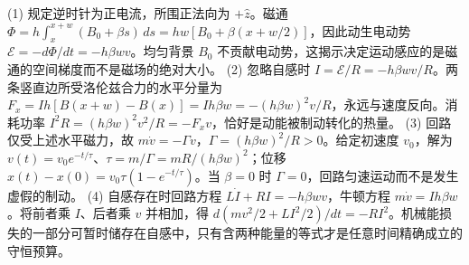 (1) 规定逆时针为正电流，所围正法向为 \(+\hat z\)。磁通 \(\Phi=h\int_x^{x+w}(B_0+\beta s)\,ds=hw[B_0+\beta(x+w/2)]\)，因此动生电动势 \(\mathcal E=-d\Phi/dt=-h\beta wv\)。均匀背景 \(B_0\) 不贡献电动势，这揭示决定运动感应的是磁通的空间梯度而不是磁场的绝对大小。
(2) 忽略自感时 \(I=\mathcal E/R=-h\beta wv/R\)。两条竖直边所受洛伦兹合力的水平分量为 \(F_x=Ih[B(x+w)-B(x)]=Ih\beta w=-(h\beta w)^2v/R\)，永远与速度反向。消耗功率 \(I^2R=(h\beta w)^2v^2/R=-F_xv\)，恰好是动能被制动转化的热量。
(3) 回路仅受上述水平磁力，故 \(m\dot v=-\Gamma v\)，\(\Gamma=(h\beta w)^2/R>0\)。给定初速度 \(v_0\)，解为 \(v(t)=v_0 e^{-t/\tau}\)、\(\tau=m/\Gamma=mR/(h\beta w)^2\)；位移 \(x(t)-x(0)=v_0\tau(1-e^{-t/\tau})\)。当 \(\beta=0\) 时 \(\Gamma=0\)，回路匀速运动而不是发生虚假的制动。
(4) 自感存在时回路方程 \(L\dot I+RI=-h\beta wv\)，牛顿方程 \(m\dot v=Ih\beta w\)。将前者乘 \(I\)、后者乘 \(v\) 并相加，得 \(d(mv^2/2+LI^2/2)/dt=-RI^2\)。机械能损失的一部分可暂时储存在自感中，只有含两种能量的等式才是任意时间精确成立的守恒预算。
